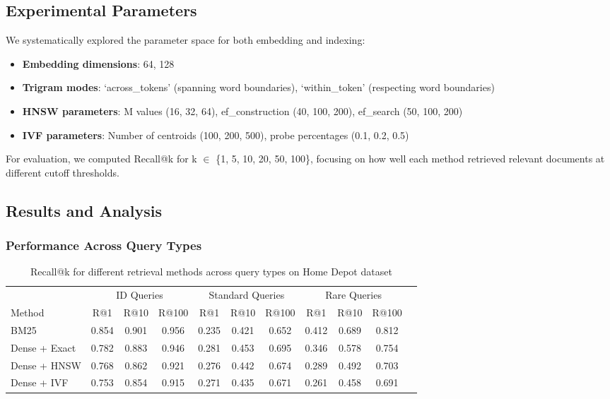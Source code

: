 \documentclass[sigconf,review]{acmart}
\begin{document}
\subsection{Experimental Parameters}
We systematically explored the parameter space for both embedding and indexing:

\begin{itemize}
    \item \textbf{Embedding dimensions}: 64, 128
    \item \textbf{Trigram modes}: `across\_tokens' (spanning word boundaries), `within\_token' (respecting word boundaries)
    \item \textbf{HNSW parameters}: M values (16, 32, 64), ef\_construction (40, 100, 200), ef\_search (50, 100, 200)
    \item \textbf{IVF parameters}: Number of centroids (100, 200, 500), probe percentages (0.1, 0.2, 0.5)
\end{itemize}

For evaluation, we computed Recall@k for k $\in$ \{1, 5, 10, 20, 50, 100\}, focusing on how well each method retrieved relevant documents at different cutoff thresholds.

\subsection{Results and Analysis}

\subsubsection{Performance Across Query Types}

\begin{table}[t]
\caption{Recall@k for different retrieval methods across query types on Home Depot dataset}
\label{tab:query_types}
\centering
\begin{tabular}{lcccccccccc}
\toprule
& \multicolumn{3}{c}{ID Queries} & \multicolumn{3}{c}{Standard Queries} & \multicolumn{3}{c}{Rare Queries} \\
\cmidrule(lr){2-4} \cmidrule(lr){5-7} \cmidrule(lr){8-10}
Method & R@1 & R@10 & R@100 & R@1 & R@10 & R@100 & R@1 & R@10 & R@100 \\
\midrule
BM25   & 0.854 & 0.901 & 0.956 & 0.235 & 0.421 & 0.652 & 0.412 & 0.689 & 0.812 \\
Dense + Exact & 0.782 & 0.883 & 0.946 & 0.281 & 0.453 & 0.695 & 0.346 & 0.578 & 0.754 \\
Dense + HNSW & 0.768 & 0.862 & 0.921 & 0.276 & 0.442 & 0.674 & 0.289 & 0.492 & 0.703 \\
Dense + IVF & 0.753 & 0.854 & 0.915 & 0.271 & 0.435 & 0.671 & 0.261 & 0.458 & 0.691 \\
\bottomrule
\end{tabular}
\end{table}
\end{document}
